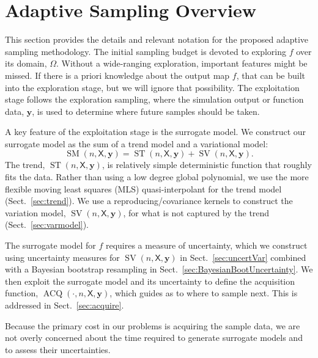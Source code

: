 \documentclass[11pt]{NSFamsart}
\DeclareMathOperator{\SURR}{SM} %
\DeclareMathOperator{\STREND}{ST} %
\DeclareMathOperator{\SVAR}{SV} %
\DeclareMathOperator{\VAL}{ACQ}
\newcommand{\mX}{\mathsf{X}}
\newcommand{\by}{{\boldsymbol{y}}}
\begin{document}
\section{Adaptive Sampling Overview} \label{sec:overview}
This section provides the details and relevant notation for the proposed adaptive sampling methodology. The initial sampling budget is devoted to exploring $f$ over its domain, $\Omega$. Without a wide-ranging exploration, important features might be missed. If there is a priori knowledge about the output map $f$, that can be built into the exploration stage, but we will ignore that possibility. The exploitation stage follows the exploration sampling, where the simulation output or function data, $\by$, is used to determine where future samples should be taken.

A key feature of the exploitation stage is the surrogate model. We construct our surrogate model as the sum of a trend model and a variational model: 
\begin{equation*}
\SURR(n,\mX,\by) = \STREND(n,\mX,\by) + \SVAR(n,\mX,\by). 
\end{equation*} 
The trend, $\STREND(n,\mX,\by)$, is relatively simple deterministic function that roughly fits the data. Rather than using a low degree global polynomial, we use the more flexible moving least squares (MLS) quasi-interpolant for the trend model (Sect.\ \ref{sec:trend}). We use a reproducing/covariance kernels to construct the variation model, $\SVAR(n,\mX,\by)$, for what is not captured by the trend (Sect.\ \ref{sec:varmodel}). 

The surrogate model for $f$ requires a measure of uncertainty, which we construct using uncertainty measures for $\SVAR(n,\mX,\by)$ in Sect.\ \ref{sec:uncertVar} combined with a Bayesian bootstrap resampling in Sect.\ \ref{sec:BayesianBootUncertainty}. We then exploit the surrogate model and its uncertainty to define the acquisition function, $\VAL(\cdot, n,\mX,\by)$, which guides as to where to sample next. This is addressed in Sect.\ \ref{sec:acquire}. 

Because the primary cost in our problems is acquiring the sample data, we are not overly concerned about the time required to generate surrogate models and to assess their uncertainties.


\end{document}
